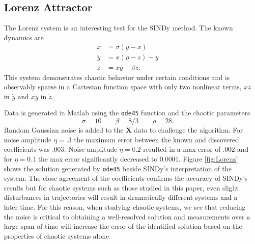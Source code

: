 \documentclass[%
 aip,12pt,
rsi,%
 amsmath,amssymb,
 reprint,%
]{revtex4-1}
\begin{document}
{\subsection{Lorenz Attractor}
The Lorenz system is an interesting test for the SINDy method. The known dynamics are 
\begin{align}
  \dot{x} &= \sigma(y - x) \\
  \dot{y} &= x(\rho - z) - y \\
  \dot{z} &= xy - \beta z.
\end{align}
This system demonstrates chaotic behavior under certain conditions and is observably sparse in a Cartesian function space with only two nonlinear terms, $xz$ in $\dot{y}$ and $xy$ in $\dot{z}$. 

Data is generated in Matlab using the \verb|ode45| function and the chaotic parameters
\begin{equation}
  \sigma=10 \qquad \beta=8/3 \qquad \rho=28.
\end{equation} 
Random Gaussian noise is added to the $\bm{\dot{X}}$ data to challenge the algorithm. For noise amplitude $\eta=.3$ the maximum error between the known and discovered coefficients was .003. Noise amplitude $\eta=0.2$ resulted in a max error of .002 and for $\eta=0.1$ the max error significantly decreased to 0.0001. Figure \ref{fig:Lorenz} shows the solution generated by \verb|ode45| beside SINDy's interpretation of the system. The close agreement of the coefficients confirms the accuracy of SINDy's results but for chaotic systems such as those studied in this paper, even slight disturbances in trajectories will result in dramatically different systems and a later time. For this reason, when studying chaotic systems, we see that reducing the noise is critical to obtaining a well-resolved solution and measurements over a large span of time will increase the error of the identified solution based on the properties of chaotic systems alone. 





}
\end{document}
